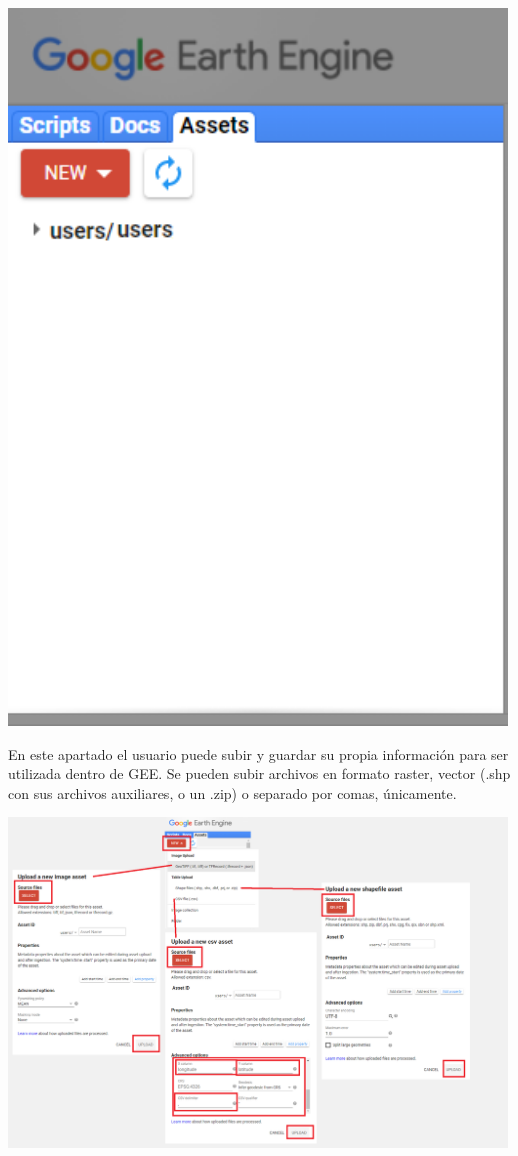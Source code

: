 \documentclass[
]{article}
\begin{document}
\includegraphics[width=500px]{Img/assets}

En este apartado el usuario puede subir y guardar su propia información
para ser utilizada dentro de GEE. Se pueden subir archivos en formato
raster, vector (.shp con sus archivos auxiliares, o un .zip) o separado
por comas, únicamente.

\includegraphics[width=500px]{Img/newAssets}
\end{document}
